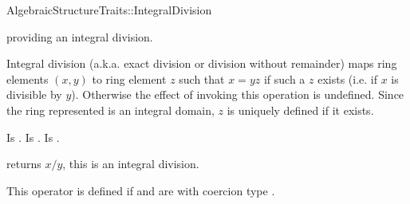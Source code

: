 \begin{ccRefFunctionObjectConcept}{AlgebraicStructureTraits::IntegralDivision}

\ccDefinition

 providing an integral division. 

Integral division (a.k.a. exact division or division without remainder) maps 
ring elements $(x,y)$ to ring element $z$ such that $x = yz$ if such a $z$ 
exists (i.e. if $x$ is divisible by $y$). Otherwise the effect of invoking 
this operation is undefined. Since the ring represented is an integral domain, 
$z$ is uniquely defined if it exists. 

\ccRefines 


\ccTypes
{} 
        { Is .}
\ccGlue
{} 
        { Is .}
\ccGlue
{} 
        { Is .}

\ccOperations
{}

        { returns  $x/y$, this is an integral division. }


         {This operator is defined if  and  are  
          with coercion type . }


\ccSeeAlso

\\

\end{ccRefFunctionObjectConcept} 
